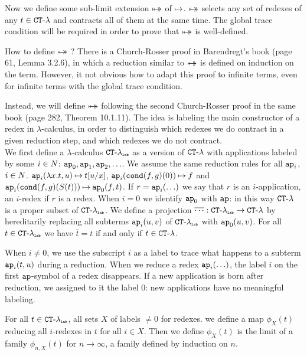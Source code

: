 Now we define some sub-limit extension ${\mapsto\!\!\!\!\! \mapsto}$ of $\mathbin{\mapsto}$.
${\mapsto\!\!\!\!\! \mapsto}$ selects any set of redexes of any $t \in { {\tt CT} \mbox{-} \lambda}$ 
and contracts all of them at the same time. 
The global trace condition will be required in order to prove that ${\mapsto\!\!\!\!\! \mapsto}$ is well-defined.



How to define  ${\mapsto\!\!\!\!\! \mapsto}$ ?
There is a Church-Rosser proof in Barendregt's book (page 61, Lemma 3.2.6),
in which a reduction similar to ${\mapsto\!\!\!\!\! \mapsto}$ is defined on induction on the term. 
However, it not obvious how to adapt this proof to infinite terms,
even for infinite terms with the global trace condition.

Instead, we will define ${\mapsto\!\!\!\!\! \mapsto}$ following the second
Church-Rosser proof in the same book (page 282, Theorem 10.1.11).
The idea is labeling the main constructor of a redex in $\lambda$-calculus,
in order to distinguish which redexes we do contract in a given reduction step, and which 
redexes we do not contract.
\\



We first define a $\lambda$-calculus ${{ {\tt CT} \mbox{-} \lambda}_{\mbox{\tiny \tt lab}}}$ as a version of ${ {\tt CT} \mbox{-} \lambda}$ 
with applications labeled by some $i \in {N}$:
${\tt ap}_0, {\tt ap}_1, {\tt ap}_2, \ldots$. We assume the same reduction rules for all ${\tt ap}_i$, $i \in {N}$.
${\tt ap}_i(\lambda x.t,u) \mathbin{\mapsto} t[u/x]$, ${\tt ap}_i({\tt cond}(f,g)(0)) \mathbin{\mapsto} f$ and
${\tt ap}_i({\tt cond}(f,g)(S(t))) \mathbin{\mapsto} {\tt ap}_0(f,t)$. 
If $r = {\tt ap}_i(\ldots)$ we say that $r$ is an $i$-application, an $i$-redex if $r$ is a redex.
When $i=0$ we identify ${\tt ap}_0$ with ${\tt ap}$: in this way ${ {\tt CT} \mbox{-} \lambda}$  is a proper
subset of ${{ {\tt CT} \mbox{-} \lambda}_{\mbox{\tiny \tt lab}}}$.
We define a projection $\overline{\cdots} : {{ {\tt CT} \mbox{-} \lambda}_{\mbox{\tiny \tt lab}}} \rightarrow { {\tt CT} \mbox{-} \lambda}$
by hereditarily replacing all subterms ${\tt ap}_i(u,v)$ of ${{ {\tt CT} \mbox{-} \lambda}_{\mbox{\tiny \tt lab}}}$ with 
 ${\tt ap}_0(u,v)$. For all $t \in { { {\tt CT} \mbox{-} \lambda} _ {\mbox{\tiny \tt lab}} }$ we have  $\overline{t} = t$
if and only if $t \in { {\tt CT} \mbox{-} \lambda}$.

When $i \not = 0$, we use the subscript $i$ as a label to trace what
happens to a subterm ${\tt ap}_i(t,u)$ during a reduction. When we reduce a redex ${\tt ap}_i(\ldots)$,
the label $i$ on the first ${\tt ap}$-symbol of a redex disappears. 
If a new application is born after reduction, we assigned to it the label $0$: new applications have no
meaningful labeling. 


For all $t \in { { {\tt CT} \mbox{-} \lambda} _ {\mbox{\tiny \tt lab}} }$, all sets $X$ of labels $\not = 0$ for redexes.
we define a map  $\phi_X(t)$ reducing all $i$-redexes in $t$ for all $i \in X$. 
Then we define $\phi_X(t)$ is the limit of a family $\phi_{n,X}(t)$ for $n \rightarrow \infty$, 
a family defined by induction on $n$.


